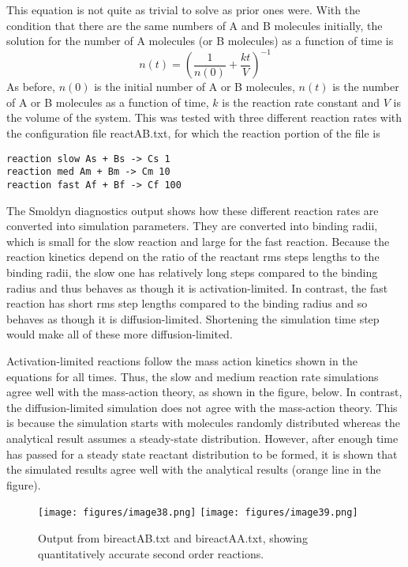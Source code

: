\documentclass {scrbook}
\begin{document}
This equation is not quite as trivial to solve as prior ones were. With the condition that there are the same numbers of A and B molecules initially, the solution for the number of A molecules (or B molecules) as a function of time is
$$n(t) = \left(\frac{1}{n(0)} + \frac{kt}{V} \right)^{-1}$$
As before, $n(0)$ is the initial number of A or B molecules, $n(t)$ is the number of A or B molecules as a function of time, $k$ is the reaction rate constant and $V$ is the volume of the system. This was tested with three different reaction rates with the configuration file reactAB.txt, for which the reaction portion of the file is

\begin{lstlisting}[style=SSAC]
reaction slow As + Bs -> Cs 1
reaction med Am + Bm -> Cm 10
reaction fast Af + Bf -> Cf 100
\end{lstlisting}
The Smoldyn diagnostics output shows how these different reaction rates are converted into simulation parameters. They are converted into binding radii, which is small for the slow reaction and large for the fast reaction. Because the reaction kinetics depend on the ratio of the reactant rms steps lengths to the binding radii, the slow one has relatively long steps compared to the binding radius and thus behaves as though it is activation-limited. In contrast, the fast reaction has short rms step lengths compared to the binding radius and so behaves as though it is diffusion-limited. Shortening the simulation time step would make all of these more diffusion-limited.

Activation-limited reactions follow the mass action kinetics shown in the equations for all times. Thus, the slow and medium reaction rate simulations agree well with the mass-action theory, as shown in the figure, below. In contrast, the diffusion-limited simulation does not agree with the mass-action theory. This is because the simulation starts with molecules randomly distributed whereas the analytical result assumes a steady-state distribution. However, after enough time has passed for a steady state reactant distribution to be formed, it is shown that the simulated results agree well with the analytical results (orange line in the figure).

\begin{figure}[h]
\centering
\texttt{[image: figures/image38.png]}
\texttt{[image: figures/image39.png]}
\caption{Output from bireactAB.txt and bireactAA.txt, showing quantitatively accurate second order reactions.}
\label{fig:bireactAB}
\end{figure}
\end{document}
